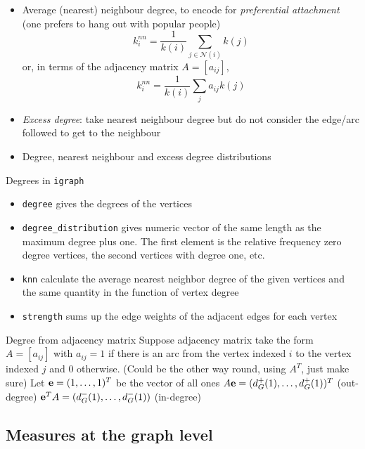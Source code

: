 \documentclass[aspectratio=43]{beamer}
\begin{document}
\begin{frame}
	\begin{itemize}
		\item Average (nearest) neighbour degree, to encode for \emph{preferential attachment} (one prefers to hang out with popular people)
		\[
			k_i^{nn} = \frac{1}{k(i)}\sum_{j\in\mathcal{N}(i)}k(j)
		\]
		or, in terms of the adjacency matrix $A=[a_{ij}]$,
		\[
			k_i^{nn} = \frac{1}{k(i)}\sum_{j}a_{ij}k(j)
		\]
		\item \emph{Excess degree}: take nearest neighbour degree but do not consider the edge/arc followed to get to the neighbour
		\item Degree, nearest neighbour and excess degree distributions
	\end{itemize}
\end{frame}


\begin{frame}{Degrees in {\tt igraph}}
	\begin{itemize}
		\item {\tt degree} gives the degrees of the vertices
		\item {\tt degree\_distribution} gives numeric vector of the same length as the maximum degree plus one. The first element is the relative frequency zero degree vertices, the second vertices with degree one, etc.
		\item {\tt knn} calculate the average nearest neighbor degree of the given vertices and the same quantity in the function of vertex degree
		\item {\tt strength} sums up the edge weights of the adjacent edges for each vertex
	\end{itemize}
\end{frame}

\begin{frame}{Degree from adjacency matrix}
	Suppose adjacency matrix take the form $A=[a_{ij}]$ with $a_{ij}=1$ if there is an arc from the vertex indexed $i$ to the vertex indexed $j$ and 0 otherwise. (Could be the other way round, using $A^T$, just make sure)
	\vfill
	Let $\mathbf{e}=(1,\ldots,1)^T$ be the vector of all ones 
	\vfill
	$A\mathbf{e}=(d_G^+(1),\ldots,d_G^+(1))^T$ (out-degree)
	\vfill
	$\mathbf{e}^TA=(d_G^-(1),\ldots,d_G^-(1))$ (in-degree)
\end{frame}


\subsection{Measures at the graph level}
\end{document}
